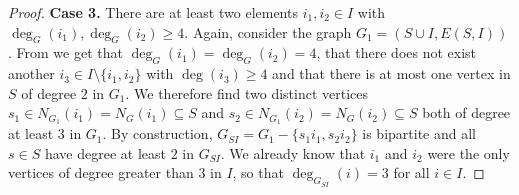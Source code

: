 \documentclass[a4paper,11pt,oneside]{scrartcl}
\theoremstyle{definition}
\theoremstyle{remark}
\begin{document}
\begin{proof}
    \textbf{Case 3.} There are at least two elements $i_1,i_2 \in I$ with $\deg_G(i_1), \deg_G(i_2) \geq 4$. Again, consider the graph $G_1 = (S \cup I, E(S,I))$. From  we get that $\deg_G(i_1)= \deg_G(i_2) = 4$, that there does not exist another $i_3 \in I \setminus \{i_1,i_2\}$ with $\deg(i_3) \geq 4$ and that there is at most one vertex in $S$ of degree $2$ in $G_1$. We therefore find two distinct vertices $s_1 \in N_{G_1}(i_1) = N_{G}(i_1) \subseteq S$ and $s_2 \in N_{G_1}(i_2) = N_{G}(i_2) \subseteq S$ both of degree at least $3$ in $G_1$. By construction, $G_{SI} = G_1 - \{s_1i_1,s_2i_2\}$ is bipartite and all $s\in S$ have degree at least $2$ in $G_{SI}$. We already know that $i_1$ and $i_2$ were the only vertices of degree greater than $3$ in $I$, so that $\deg_{G_{SI}}(i) = 3$ for all $i\in I$.
\end{proof}
\end{document}
